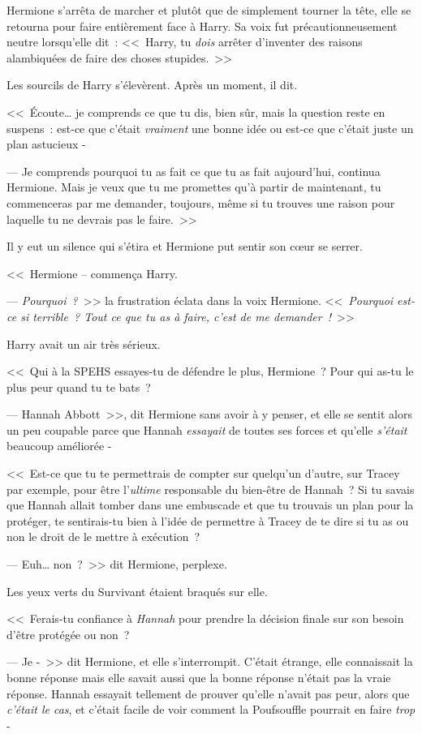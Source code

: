 Hermione s'arrêta de marcher et plutôt que de simplement tourner la tête, elle se retourna pour faire entièrement face à Harry. Sa voix fut précautionneusement neutre lorsqu'elle dit~: <<~Harry, tu \emph{dois} arrêter d'inventer des raisons alambiquées de faire des choses stupides.~>>

Les sourcils de Harry s'élevèrent. Après un moment, il dit.

<<~Écoute… je comprends ce que tu dis, bien sûr, mais la question reste en suspens~: est-ce que c'était \emph{vraiment} une bonne idée ou est-ce que c'était juste un plan astucieux -

--- Je comprends pourquoi tu as fait ce que tu as fait aujourd'hui, continua Hermione. Mais je veux que tu me promettes qu'à partir de maintenant, tu commenceras par me demander, toujours, même si tu trouves une raison pour laquelle tu ne devrais pas le faire.~>>

Il y eut un silence qui s'étira et Hermione put sentir son cœur se serrer.

<<~Hermione -- commença Harry.

--- \emph{Pourquoi~?}~>> la frustration éclata dans la voix Hermione. <<~\emph{Pourquoi est-ce si terrible~? Tout ce que tu as à faire, c'est de me demander~!}~>>

Harry avait un air très sérieux.

<<~Qui à la SPEHS essayes-tu de défendre le plus, Hermione~? Pour qui as-tu le plus peur quand tu te bats~?

--- Hannah Abbott~>>, dit Hermione sans avoir à y penser, et elle se sentit alors un peu coupable parce que Hannah \emph{essayait} de toutes ses forces et qu'elle \emph{s'était} beaucoup améliorée -

<<~Est-ce que tu te permettrais de compter sur quelqu'un d'autre, sur Tracey par exemple, pour être l'\emph{ultime} responsable du bien-être de Hannah~? Si tu savais que Hannah allait tomber dans une embuscade et que tu trouvais un plan pour la protéger, te sentirais-tu bien à l'idée de permettre à Tracey de te dire si tu as ou non le droit de le mettre à exécution~?

--- Euh… non~?~>> dit Hermione, perplexe.

Les yeux verts du Survivant étaient braqués sur elle.

<<~Ferais-tu confiance à \emph{Hannah} pour prendre la décision finale sur son besoin d'être protégée ou non~?

--- Je -~>> dit Hermione, et elle s'interrompit. C'était étrange, elle connaissait la bonne réponse mais elle savait aussi que la bonne réponse n'était pas la vraie réponse. Hannah essayait tellement de prouver qu'elle n'avait pas peur, alors que \emph{c'était le cas}, et c'était facile de voir comment la Poufsouffle pourrait en faire \emph{trop} -

